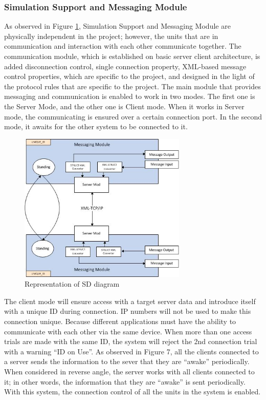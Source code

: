 \documentclass[conference]{IEEEtran}
\begin{document}
\subsubsection{Simulation Support and Messaging Module}

As observed in Figure \ref{fig:RepresentationSDDiagram}, Simulation Support and
Messaging Module are physically independent in the project; however, the units that are in
communication and interaction with each other  communicate together. The communication module, which is established on basic server client architecture, is added disconnection control, single connection property, XML-based message control properties, which are specific to the project, and designed in the light of the protocol rules that are specific to the project. The main module that provides messaging and communication is enabled to work in two modes. The first one is the Server Mode, and the other one is Client mode. When it works in Server mode, the communicating is ensured over a certain connection port. In the second mode, it awaits for the other system to be connected to it.


\begin{figure}[h!]
  \centering
  \includegraphics[width=8cm]{RepresentationSDDiagram.jpg}
  \caption{Representation of SD  diagram}\label{fig:RepresentationSDDiagram}
\end{figure}

The client mode will ensure access with a target server data and introduce itself with a unique ID during connection. IP numbers will not be used to make this connection unique.
Because different applications must have the ability to communicate with each other via the same device. When more than one access trials are made with the same ID, the system
will reject the 2nd connection trial with a warning “ID on Use”. As observed in Figure 7, all the clients connected to a server sends the information to the sever that they are “awake” periodically. When considered in reverse angle, the server works with all clients connected to it; in other words, the information that they are “awake” is sent periodically. With this system, the connection control of all the units in the
system is enabled.
\end{document}
